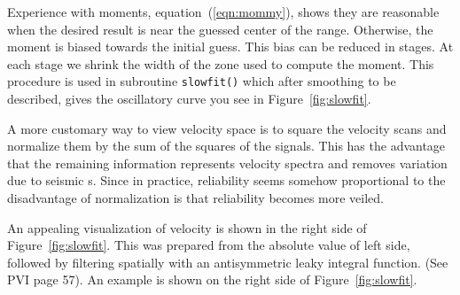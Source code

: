 \par
Experience with moments,
equation~(\ref{eqn:mommy}),
shows they are reasonable when
the desired result is near the guessed center of the range.
Otherwise, the moment is biased towards the initial guess.
This bias can be reduced in stages.
At each stage we shrink the width of the zone used to compute the moment.
This procedure is used in subroutine \texttt{slowfit()} 
which
after smoothing to be described,
gives the oscillatory curve you see in Figure~\ref{fig:slowfit}.


A more customary way to view velocity space
is to square the velocity scans
and normalize them by the sum of the squares of the signals.
This has the advantage that the remaining information
represents velocity spectra
and removes variation due to seismic s.
Since in practice, reliability seems somehow proportional to 
the disadvantage of normalization
is that reliability becomes more veiled.

\par
An appealing visualization of velocity is shown in the right side
of Figure~\ref{fig:slowfit}.
This was prepared from the absolute value of left side,
followed by filtering spatially with an antisymmetric
leaky integral function.
(See PVI page 57).
An example is shown on the right side of Figure~\ref{fig:slowfit}.

%
%

